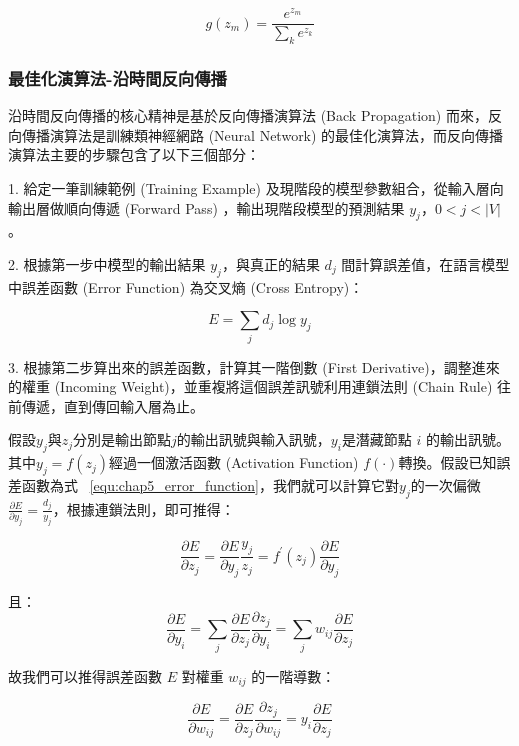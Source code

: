 \begin{equation}
g(z_m) = \frac{e^{z_m}}{\sum_k e^{z_k}}
\end{equation}

\subsubsection{最佳化演算法-沿時間反向傳播}
沿時間反向傳播的核心精神是基於反向傳播演算法 (Back Propagation) 而來，反向傳播演算法是訓練類神經網路 (Neural Network) 的最佳化演算法，而反向傳播演算法主要的步驟包含了以下三個部分：

1. 給定一筆訓練範例 (Training Example) 及現階段的模型參數組合，從輸入層向輸出層做順向傳遞 (Forward Pass) ，輸出現階段模型的預測結果 $y_j$，$0<j<|V|$。

2. 根據第一步中模型的輸出結果 $y_j$，與真正的結果 $d_j$ 間計算誤差值，在語言模型中誤差函數 (Error Function) 為交叉熵 (Cross Entropy)：

\begin{equation}
\label{equ:chap5_error_function}
E = \sum_j d_j \log{y_j}
\end{equation}

3. 根據第二步算出來的誤差函數，計算其一階倒數 (First Derivative)，調整進來的權重 (Incoming Weight)，並重複將這個誤差訊號利用連鎖法則 (Chain Rule) 往前傳遞，直到傳回輸入層為止。

假設$y_j$與$z_j$分別是輸出節點$j$的輸出訊號與輸入訊號，$y_i$是潛藏節點 $i$ 的輸出訊號。其中$y_j=f(z_j)$經過一個激活函數 (Activation Function) $f(\cdot)$轉換。假設已知誤差函數為式 ~\ref{equ:chap5_error_function}，我們就可以計算它對$y_j$的一次偏微$\frac{\partial E}{\partial y_j} = \frac{d_j}{y_j}$，根據連鎖法則，即可推得：

\begin{equation}
\frac{\partial E}{\partial z_j} = \frac{\partial E}{\partial y_j} \frac{y_j}{z_j} = f^{'}(z_j) \frac{\partial E}{\partial y_j}
\end{equation}

且：
\begin{equation}
\frac{\partial E}{\partial y_i} = \sum_j \frac{\partial E}{\partial z_j} \frac{\partial z_j}{\partial y_i} = \sum_j w_{ij} \frac{\partial E}{\partial z_j}
\end{equation}

故我們可以推得誤差函數 $E$ 對權重 $w_{ij}$ 的一階導數：

\begin{equation}
\frac{\partial E}{\partial w_{ij}} = \frac{\partial E}{\partial z_j} \frac{\partial z_j}{\partial w_{ij}} = y_i \frac{\partial E}{\partial z_j} 
\end{equation}

